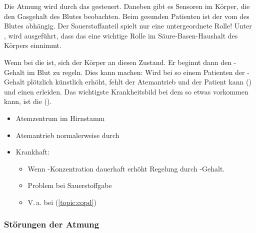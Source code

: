 



{%
Die Atmung wird durch das 
gesteuert. Daneben gibt es Sensoren im Körper, die den
Gasgehalt des Blutes beobachten.
Beim gesunden Patienten ist der  vom
 des Blutes abhängig. Der
Sauerstoffanteil spielt nur eine untergeordnete Rolle! Unter
, wird
ausgeführt, dass das  eine wichtige Rolle im
Säure-Basen-Haushalt des Körpers einnimmt.

Wenn bei  die
 ist, 
sich der Körper an diesen Zustand. Er beginnt dann den
-Gehalt im Blut zu
regeln.
Dies kann  machen: Wird bei so einem Patienten
der -Gehalt plötzlich künstlich erhöht, fehlt der
Atemantrieb und der Patient kann 
() und
einen  erleiden.
Das wichtigste Krankheitsbild bei dem so etwas vorkommen
kann, ist die  ().
}{
\begin{itemize}
  \item Atemzentrum im Hirnstamm
  \item Atemantrieb normalerweise durch 
  \item Krankhaft:
  \begin{itemize}
    \item Wenn -Konzentration dauerhaft erhöht
     Regelung durch
    -Gehalt.
    \item Problem bei Sauerstoffgabe
    \item V.\,a. bei  (\ref{topic:copd})
  \end{itemize}
\end{itemize}
}{}{}{}





\subsubsection{Störungen der Atmung}
\label{topic:atemstörungen}
\label{topic:atemstillstand}

